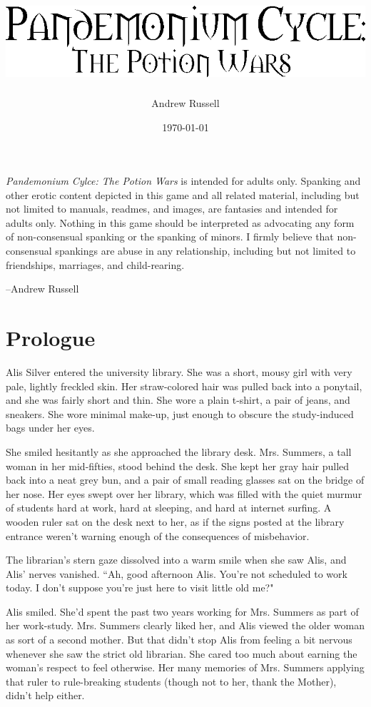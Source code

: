 \documentclass{report}
\title{\includegraphics{title}}
\author{Andrew Russell}
\date{\today}
\begin{document}
\textit{Pandemonium Cylce: The Potion Wars} is intended for adults only. Spanking and other erotic content depicted in this game and all related material,
including but not limited to manuals, readmes, and images, are fantasies and intended for adults only. Nothing in this game should be interpreted as advocating any
form of non-consensual spanking or the spanking of minors. I firmly believe that non-consensual spankings are abuse in any relationship, including but not
limited to friendships, marriages, and child-rearing.

--Andrew Russell

\chapter*{Prologue}
\label{ch_prologue}
Alis Silver entered the university library. She was a short, mousy girl with very pale, lightly freckled skin. Her straw-colored hair was pulled back
into a ponytail, and she was fairly
short and thin. She wore a plain t-shirt, a pair of jeans, and sneakers. She wore minimal make-up, just enough to obscure the study-induced bags under her eyes. 

She 
smiled hesitantly as she approached the library desk. Mrs. Summers, a tall woman in her mid-fifties, stood behind the desk. She kept her gray hair pulled 
back into a neat grey bun, and a pair of small reading glasses sat on the bridge of her nose. Her eyes swept over her library, which was filled with the quiet murmur of 
students
hard at work, hard at sleeping, and hard at internet surfing. A wooden ruler sat on the desk next to her, as if the signs posted at the library entrance weren't warning
enough of the consequences of misbehavior.

The librarian's stern gaze dissolved into a warm smile when she saw Alis, and Alis' nerves vanished. ``Ah, good afternoon Alis. You're not scheduled to work
today. I don't suppose you're just here to visit little old me?"

Alis smiled. She'd spent the past two years working for Mrs. Summers as part of her work-study. Mrs. Summers clearly liked her, and Alis viewed the older woman as sort of a 
second mother. But that didn't stop Alis from feeling a bit nervous whenever she saw the strict old librarian. She cared too much about earning the woman's respect to feel 
otherwise. Her many memories of Mrs. Summers applying that ruler to rule-breaking students (though not to her, thank the Mother), didn't help either.
\end{document}
